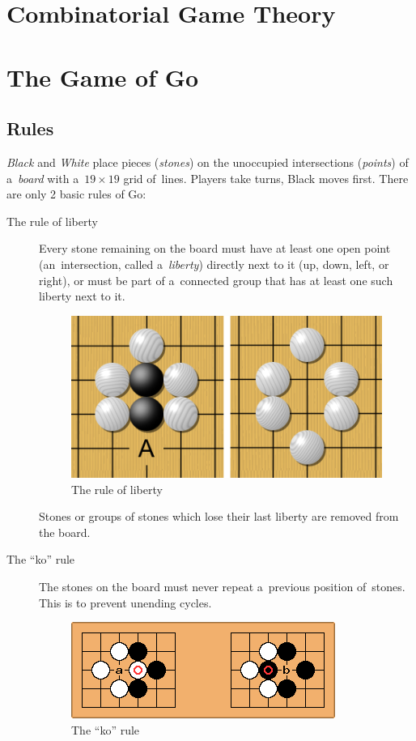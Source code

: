\section{Combinatorial Game Theory}
\label{sec:CGT}

\todo

\section{The Game of Go}
\label{sec:Go}

\subsection{Rules}

\emph{Black} and \emph{White} place pieces (\emph{stones}) on the unoccupied intersections (\emph{points}) of a~\emph{board} with a~$19\times19$ grid of~lines.
Players take turns, Black moves first.
There are only 2 basic rules of Go:
\begin{description}
  \item [The rule of liberty]
    Every stone remaining on the board must have at least one open point (an~intersection, called a~\emph{liberty}) directly next to it (up, down, left, or right), or must be part of a~connected group that has at least one such liberty next to it.
    \begin{figure}[H]
      \centering
      \includegraphics[width=.5\textwidth]{../img/Go_rule_of_liberty.png}
      \caption{The rule of liberty}
      \label{fig:Go-rule-liberty}
    \end{figure}

    Stones or groups of stones which lose their last liberty are removed from the board.

  \item [The ``ko'' rule]
    The stones on the board must never repeat a~previous position of~stones.
    This is to prevent unending cycles.
    \begin{figure}[H]
      \centering
      \includegraphics[width=.5\textwidth]{../img/Go_ko_rule.png}
      \caption{The ``ko'' rule}
      \label{fig:Go-Ko-rule}
    \end{figure}

\end{description}

